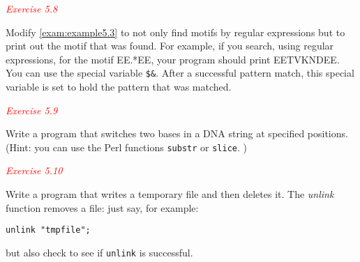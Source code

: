 \textcolor{red}{\textit{Exercise 5.8}}
\begin{adjustwidth}{1cm}{}
Modify \autoref{exam:example5.3} to not only find motifs by regular expressions but to print out the motif that was found. For example, if you search, using regular expressions, for the motif EE.*EE, your program should print EETVKNDEE. You can use the special variable \verb|$&|. After a successful pattern match, this special variable is set to hold the pattern that was matched. 
\end{adjustwidth}

\textcolor{red}{\textit{Exercise 5.9}}
\begin{adjustwidth}{1cm}{}
Write a program that switches two bases in a DNA string at specified positions. (Hint: you can use the Perl functions \verb|substr| or \verb|slice|. )
\end{adjustwidth}

\textcolor{red}{\textit{Exercise 5.10}}
\begin{adjustwidth}{1cm}{}
Write a program that writes a temporary file and then deletes it.  The \textit{unlink} function removes a file: just say, for example:
\begin{lstlisting}
unlink "tmpfile";
\end{lstlisting}
but also check to see if \verb|unlink| is successful.
\end{adjustwidth}
